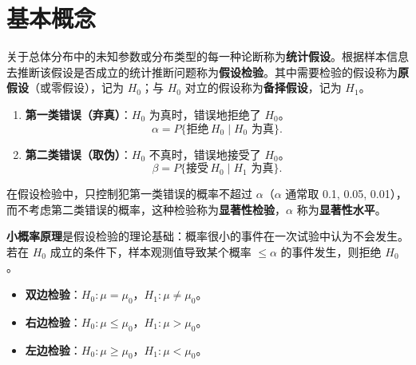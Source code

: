 \documentclass[lang=cn,11pt]{elegantbook}
\begin{document}
\section{基本概念}

\begin{definition}[假设检验] \label{def:hypothesis-test}
关于总体分布中的未知参数或分布类型的每一种论断称为\textbf{统计假设}。根据样本信息去推断该假设是否成立的统计推断问题称为\textbf{假设检验}。其中需要检验的假设称为\textbf{原假设}（或零假设），记为 \(H_0\)；与 \(H_0\) 对立的假设称为\textbf{备择假设}，记为 \(H_1\)。
\end{definition}

\begin{definition}[两类错误] \label{def:two-errors}
\begin{enumerate}
    \item \textbf{第一类错误（弃真）}：\(H_0\) 为真时，错误地拒绝了 \(H_0\)。
    \[
    \alpha = P\{\text{拒绝}\, H_0 \mid H_0\text{ 为真}\}.
    \]
    \item \textbf{第二类错误（取伪）}：\(H_0\) 不真时，错误地接受了 \(H_0\)。
    \[
    \beta = P\{\text{接受}\, H_0 \mid H_1\text{ 为真}\}.
    \]
\end{enumerate}
\end{definition}

\begin{definition}[显著性水平与显著性检验] \label{def:significance-level}
在假设检验中，只控制犯第一类错误的概率不超过 \(\alpha\)（\(\alpha\) 通常取 0.1, 0.05, 0.01），而不考虑第二类错误的概率，这种检验称为\textbf{显著性检验}，\(\alpha\) 称为\textbf{显著性水平}。
\end{definition}

\begin{note}
\textbf{小概率原理}是假设检验的理论基础：概率很小的事件在一次试验中认为不会发生。若在 \(H_0\) 成立的条件下，样本观测值导致某个概率 \(\leq \alpha\) 的事件发生，则拒绝 \(H_0\)。
\end{note}

\begin{definition}[双边检验与单边检验]\label{def:ht-types}
\begin{itemize}
    \item \textbf{双边检验}：\(H_0\colon \mu = \mu_0\)，\(H_1\colon \mu \neq \mu_0\)。
    \item \textbf{右边检验}：\(H_0\colon \mu \leq \mu_0\)，\(H_1\colon \mu > \mu_0\)。
    \item \textbf{左边检验}：\(H_0\colon \mu \geq \mu_0\)，\(H_1\colon \mu < \mu_0\)。
\end{itemize}
\end{definition}
\end{document}
